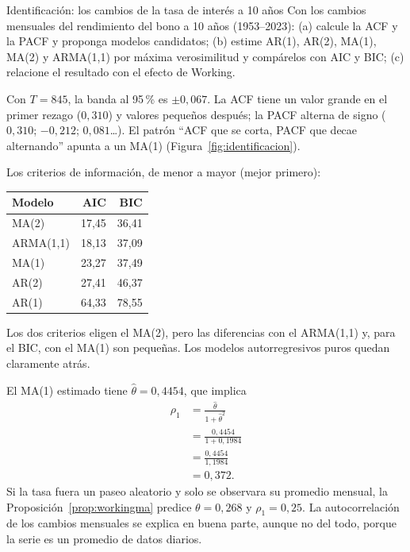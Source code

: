 \begin{ejresuelto}{Identificación: los cambios de la tasa de interés a 10 años}\label{ej:tasaarma}
\enunciado Con los cambios mensuales del rendimiento del bono a 10 años (1953--2023): (a) calcule la ACF y la
PACF y proponga modelos candidatos; (b) estime AR(1), AR(2), MA(1), MA(2) y ARMA(1,1) por máxima verosimilitud
y compárelos con AIC y BIC; (c) relacione el resultado con el efecto de Working.

\solucion
{} Con $T=845$, la banda al 95\,\% es $\pm0{,}067$. La ACF tiene un valor grande en el
primer rezago ($0{,}310$) y valores pequeños después; la PACF alterna de signo ($0{,}310$; $-0{,}212$;
$0{,}081$\ldots). El patrón ``ACF que se corta, PACF que decae alternando'' apunta a un MA(1)
(Figura~\ref{fig:identificacion}).

 Los criterios de información, de menor a mayor (mejor primero):
\begin{center}\small
\begin{tabular}{@{}lrr@{}}
\toprule
Modelo & AIC & BIC \\
\midrule
MA(2)      & 17,45 & 36,41 \\
ARMA(1,1)  & 18,13 & 37,09 \\
MA(1)      & 23,27 & 37,49 \\
AR(2)      & 27,41 & 46,37 \\
AR(1)      & 64,33 & 78,55 \\
\bottomrule
\end{tabular}
\end{center}
Los dos criterios eligen el MA(2), pero las diferencias con el ARMA(1,1) y, para el BIC, con el MA(1) son
pequeñas. Los modelos autorregresivos puros quedan claramente atrás.

 El MA(1) estimado tiene $\hat\theta=0{,}4454$, que implica
\begin{align*}
  \rho_1 &= \frac{\hat\theta}{1+\hat\theta^2}\\
         &= \frac{0{,}4454}{1+0{,}1984}\\
         &= \frac{0{,}4454}{1{,}1984}\\
         &= 0{,}372 .
\end{align*}
Si la tasa fuera un paseo aleatorio y solo se observara su promedio mensual, la Proposición~\ref{prop:workingma}
predice $\theta=0{,}268$ y $\rho_1=0{,}25$. La autocorrelación de los cambios mensuales se explica en buena
parte, aunque no del todo, porque la serie es un promedio de datos diarios.


\end{ejresuelto}
